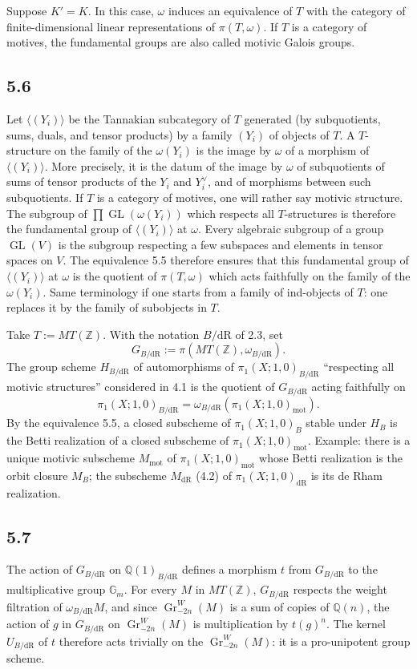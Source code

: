 \documentclass[10pt]{article}
\newcommand{\Q}{\mathbb Q}
\newcommand{\Z}{\mathbb Z}
\newcommand{\Gm}{\mathbb G_m}
\newcommand{\GL}{\operatorname{GL}}
\newcommand{\Gr}{\operatorname{Gr}}
\newcommand{\dR}{\mathrm{dR}}
\newcommand{\mot}{\mathrm{mot}}
\begin{document}
Suppose $K'=K$.
In this case, $\omega$ induces an equivalence of $T$ with the category of finite-dimensional linear representations of $\pi(T,\omega)$.
If $T$ is a category of motives, the fundamental groups are also called motivic Galois groups.

\subsection*{5.6}
Let $\langle(Y_i)\rangle$ be the Tannakian subcategory of $T$ generated (by subquotients, sums, duals, and tensor products) by a family $(Y_i)$ of objects of $T$.
A $T$-structure on the family of the $\omega(Y_i)$ is the image by $\omega$ of a morphism of $\langle(Y_i)\rangle$.
More precisely, it is the datum of the image by $\omega$ of subquotients of sums of tensor products of the $Y_i$ and $Y_i^\vee$, and of morphisms between such subquotients.
If $T$ is a category of motives, one will rather say motivic structure.
The subgroup of $\prod\GL(\omega(Y_i))$ which respects all $T$-structures is therefore the fundamental group of $\langle(Y_i)\rangle$ at $\omega$.
Every algebraic subgroup of a group $\GL(V)$ is the subgroup respecting a few subspaces and elements in tensor spaces on $V$.
The equivalence 5.5 therefore ensures that this fundamental group of $\langle(Y_i)\rangle$ at $\omega$ is the quotient of $\pi(T,\omega)$ which acts faithfully on the family of the $\omega(Y_i)$.
Same terminology if one starts from a family of ind-objects of $T$: one replaces it by the family of subobjects in $T$.

Take $T:=MT(\Z)$.
With the notation $B/\dR$ of 2.3, set
\begin{equation}
 G_{B/\dR}:=\pi(MT(\Z),\omega_{B/\dR}).
\tag{5.6.1}
\end{equation}
The group scheme $H_{B/\dR}$ of automorphisms of $\pi_1(X;1,0)_{B/\dR}$ ``respecting all motivic structures'' considered in 4.1 is the quotient of $G_{B/\dR}$ acting faithfully on
\[
 \pi_1(X;1,0)_{B/\dR}=\omega_{B/\dR}(\pi_1(X;1,0)_{\mot}).
\]
By the equivalence 5.5, a closed subscheme of $\pi_1(X;1,0)_B$ stable under $H_B$ is the Betti realization of a closed subscheme of $\pi_1(X;1,0)_{\mot}$.
Example: there is a unique motivic subscheme $M_{\mot}$ of $\pi_1(X;1,0)_{\mot}$ whose Betti realization is the orbit closure $M_B$; the subscheme $M_{\dR}$ (4.2) of $\pi_1(X;1,0)_{\dR}$ is its de Rham realization.

\subsection*{5.7}
The action of $G_{B/\dR}$ on $\Q(1)_{B/\dR}$ defines a morphism $t$ from $G_{B/\dR}$ to the multiplicative group $\Gm$.
For every $M$ in $MT(\Z)$, $G_{B/\dR}$ respects the weight filtration of $\omega_{B/\dR}M$, and since $\Gr^W_{-2n}(M)$ is a sum of copies of $\Q(n)$, the action of $g$ in $G_{B/\dR}$ on $\Gr^W_{-2n}(M)$ is multiplication by $t(g)^n$.
The kernel $U_{B/\dR}$ of $t$ therefore acts trivially on the $\Gr^W_{-2n}(M)$: it is a pro-unipotent group scheme.
\end{document}
